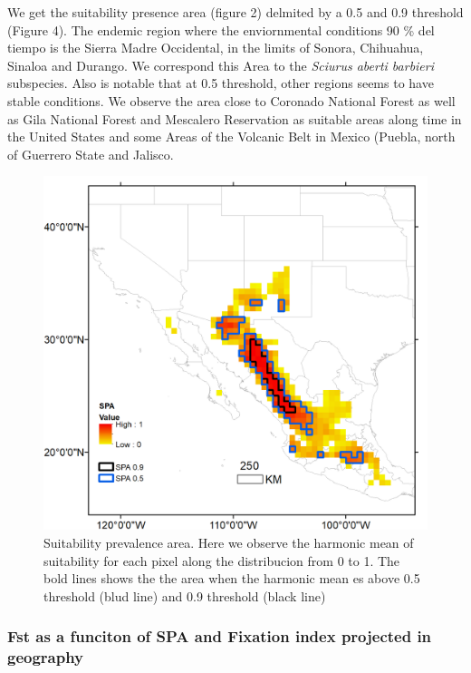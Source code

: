 \documentclass[
]{article}
\begin{document}
We get the suitability presence area (figure 2) delmited by a 0.5 and
0.9 threshold (Figure 4). The endemic region where the enviornmental
conditions 90 \% del tiempo is the Sierra Madre Occidental, in the
limits of Sonora, Chihuahua, Sinaloa and Durango. We correspond this
Area to the \emph{Sciurus aberti barbieri} subspecies. Also is notable
that at 0.5 threshold, other regions seems to have stable conditions. We
observe the area close to Coronado National Forest as well as Gila
National Forest and Mescalero Reservation as suitable areas along time
in the United States and some Areas of the Volcanic Belt in Mexico
(Puebla, north of Guerrero State and Jalisco.\\

\begin{figure}
\centering
\includegraphics{all_figures/figure_4.png}
\caption{Suitability prevalence area. Here we observe the harmonic mean
of suitability for each pixel along the distribucion from 0 to 1. The
bold lines shows the the area when the harmonic mean es above 0.5
threshold (blud line) and 0.9 threshold (black line)}
\end{figure}

\hypertarget{fst-as-a-funciton-of-spa-and-fixation-index-projected-in-geography}{%
\subsubsection{Fst as a funciton of SPA and Fixation index projected in
geography}\label{fst-as-a-funciton-of-spa-and-fixation-index-projected-in-geography}}
\end{document}
